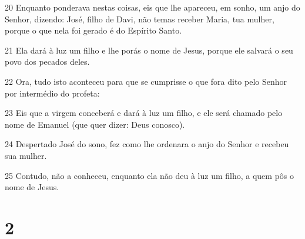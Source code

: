 \par 20 Enquanto ponderava nestas coisas, eis que lhe apareceu, em sonho, um anjo do Senhor, dizendo: José, filho de Davi, não temas receber Maria, tua mulher, porque o que nela foi gerado é do Espírito Santo.
\par 21 Ela dará à luz um filho e lhe porás o nome de Jesus, porque ele salvará o seu povo dos pecados deles.
\par 22 Ora, tudo isto aconteceu para que se cumprisse o que fora dito pelo Senhor por intermédio do profeta:
\par 23 Eis que a virgem conceberá e dará à luz um filho, e ele será chamado pelo nome de Emanuel (que quer dizer: Deus conosco).
\par 24 Despertado José do sono, fez como lhe ordenara o anjo do Senhor e recebeu sua mulher.
\par 25 Contudo, não a conheceu, enquanto ela não deu à luz um filho, a quem pôs o nome de Jesus.

\chapter{2}

